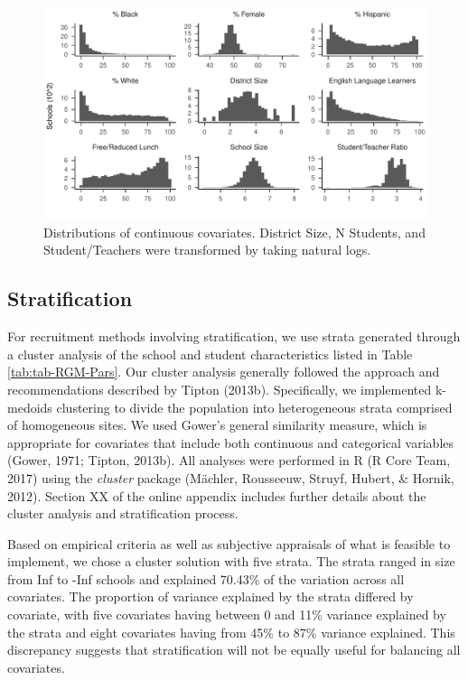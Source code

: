 \documentclass[
  english,
  man,floatsintext]{apa6}
\begin{document}
\begin{figure}
\centering
\includegraphics{6---Paper_files/figure-latex/fig-dist1-1.pdf}
\caption{\label{fig:fig-dist1}Distributions of continuous covariates. District Size, N Students, and Student/Teachers were transformed by taking natural logs.}
\end{figure}

\hypertarget{stratification}{%
\subsection{Stratification}\label{stratification}}

For recruitment methods involving stratification, we use strata generated through a cluster analysis of the school and student characteristics listed in Table \ref{tab:tab-RGM-Pars}.
Our cluster analysis generally followed the approach and recommendations described by Tipton (2013b). Specifically, we implemented k-medoids clustering to divide the population into heterogeneous strata comprised of homogeneous sites. We used Gower's general similarity measure, which is appropriate for covariates that include both continuous and categorical variables (Gower, 1971; Tipton, 2013b).
All analyses were performed in R (R Core Team, 2017) using the \emph{cluster} package (Mächler, Rousseeuw, Struyf, Hubert, \& Hornik, 2012).
Section XX of the online appendix includes further details about the cluster analysis and stratification process.

Based on empirical criteria as well as subjective appraisals of what is feasible to implement, we chose a cluster solution with five strata.
The strata ranged in size from Inf to -Inf schools and explained 70.43\% of the variation across all covariates. The proportion of variance explained by the strata differed by covariate, with five covariates having between 0 and 11\% variance explained by the strata and eight covariates having from 45\% to 87\% variance explained. This discrepancy suggests that stratification will not be equally useful for balancing all covariates.
\end{document}
